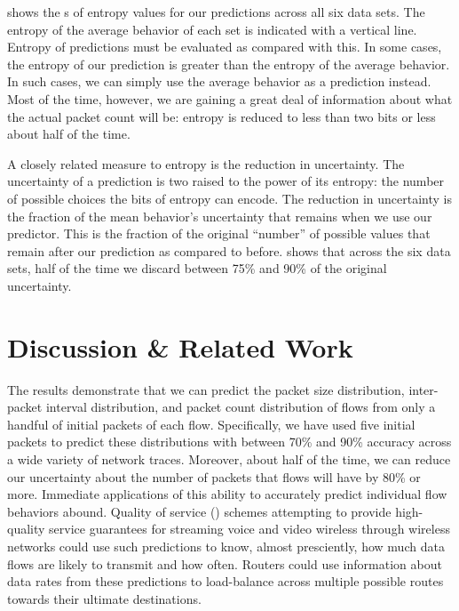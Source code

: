\documentclass{acm_proc_article-sp}
\begin{document}
 shows the s of entropy values for our predictions across all six data sets.
The entropy of the average behavior of each set is indicated with a vertical line.
Entropy of predictions must be evaluated as compared with this.
In some cases, the entropy of our prediction is greater than the entropy of the average behavior.
In such cases, we can simply use the average behavior as a prediction instead.
Most of the time, however, we are gaining a great deal of information about what the actual packet count will be:
entropy is reduced to less than two bits or less about half of the time.

A closely related measure to entropy is the reduction in uncertainty.
The uncertainty of a prediction is two raised to the power of its entropy:
the number of possible choices the bits of entropy can encode.
The reduction in uncertainty is the fraction of the mean behavior's uncertainty that remains when we use our predictor.
This is the fraction of the original ``number'' of possible values that remain after our prediction as compared to before.
 shows that across the six data sets, half of the time we discard between 75\% and 90\% of the original uncertainty.

\section{Discussion \& Related Work}

The results demonstrate that we can predict the packet size distribution, inter-packet interval distribution, and packet count distribution of flows from only a handful of initial packets of each flow.
Specifically, we have used five initial packets to predict these distributions with between 70\% and 90\% accuracy across a wide variety of network traces.
Moreover, about half of the time, we can reduce our uncertainty about the number of packets that flows will have by 80\% or more.
Immediate applications of this ability to accurately predict individual flow behaviors abound.
Quality of service () schemes attempting to provide high-quality service guarantees for streaming voice and video wireless through wireless networks could use such predictions to know, almost presciently, how much data flows are likely to transmit and how often.
Routers could use information about data rates from these predictions to load-balance across multiple possible routes towards their ultimate destinations.
\end{document}
